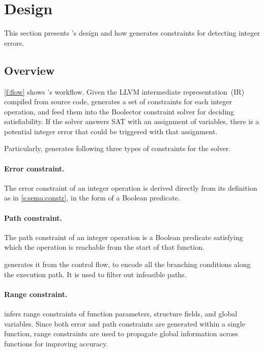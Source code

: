 \section{Design}
\label{s:gen}

This section presents \sys's design and how \sys generates constraints
for detecting integer errors.

\subsection{Overview}

\autoref{f:flow} shows \sys's workflow.  Given the LLVM intermediate
representation~(IR) compiled from source code, \sys generates a set
of constraints for each integer operation, and feed them into the
Boolector constraint solver for deciding satisfiability.  If the
solver answers SAT with an assignment of variables, there is a
potential integer error that could be triggered with that assignment.

Particularly, \sys generates following three types of constraints
for the solver.

\paragraph{Error constraint.}
The error constraint of an integer operation is derived directly
from its definition as in \autoref{s:sema:constr}, in the form of
a Boolean predicate.

\paragraph{Path constraint.}
The path constraint of an integer operation is a Boolean predicate
satisfying which the operation is reachable from the start of that
function.

\sys generates it from the control flow, to encode all
the branching conditions along the execution path.  It is used to
filter out infeasible paths.

\paragraph{Range constraint.}
\sys infers range constraints of function parameters, structure
fields, and global variables.  Since both error and path constraints
are generated within a single function, range constraints are used
to propagate global information across functions for improving
accuracy.

